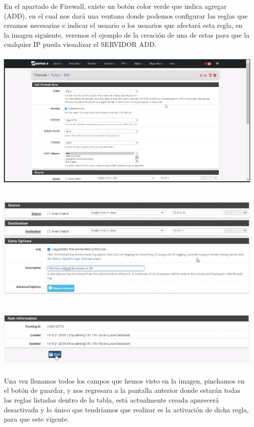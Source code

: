 \documentclass[
]{article}
\begin{document}
En el apartado de Firewall, existe un botón color verde que indica
agregar (ADD), en el cual nos dará una ventana donde podemos configurar
las reglas que creamos necesarias e indicar el usuario o los usuarios
que afectará esta regla, en la imagen siguiente, veremos el ejemplo de
la creación de una de estas para que la cualquier IP pueda visualizar el
SERVIDOR ADD.

\includegraphics[width=5.95833in,height=2.75in]{media/image10.png}

\includegraphics[width=6.1375in,height=2.29792in]{media/image11.png}

\includegraphics[width=6.1375in,height=1.19167in]{media/image12.png}

Una vez llenamos todos los campos que hemos visto en la imagen,
pinchamos en el botón de guardar, y nos regresara a la pantalla anterior
donde estarán todas las reglas listadas dentro de la tabla, está
actualmente creada aparecerá desactivada y lo único que tendríamos que
realizar es la activación de dicha regla, para que este vigente.
\end{document}
